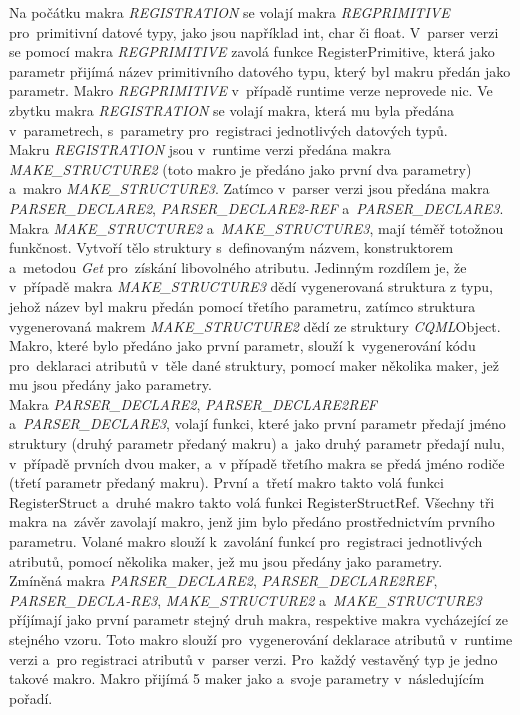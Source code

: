 \documentclass[11pt,twoside,a4paper]{book}
\begin{document}
Na počátku makra \textit{REGISTRATION} se volají makra \textit{REGPRIMITIVE} pro~primitivní datové typy, jako jsou například int, char či float. V~parser verzi se pomocí makra \textit{REGPRIMITIVE} zavolá funkce RegisterPrimitive, která jako parametr přijímá název primitivního datového typu, který byl makru předán jako parametr. Makro \textit{REGPRIMITIVE} v~případě runtime verze neprovede nic. Ve zbytku makra \textit{REGISTRATION} se volají makra, která mu byla předána v~parametrech, s~parametry pro~registraci jednotlivých datových typů.\\
Makru \textit{REGISTRATION} jsou v~runtime verzi předána makra \textit{MAKE\_STRUCTURE2} (toto makro je předáno jako první dva parametry) a~makro \textit{MAKE\_STRUCTURE3}. Zatímco v~parser verzi jsou předána makra \textit{PARSER\_DECLARE2}, \textit{PARSER\_DECLARE2-REF} a~\textit{PARSER\_DECLARE3}.\\
Makra \textit{MAKE\_STRUCTURE2} a~\textit{MAKE\_STRUCTURE3}, mají téměř totožnou funkčnost. Vytvoří tělo struktury s~definovaným názvem, konstruktorem a~metodou \textit{Get} pro~získání libovolného atributu. Jedinným rozdílem je, že v~případě makra \textit{MAKE\_STRUCTURE3} dědí vygenerovaná struktura z typu, jehož název byl makru předán pomocí třetího parametru, zatímco struktura vygenerovaná makrem \textit{MAKE\_STRUCTURE2} dědí ze struktury \textit{CQML}Object. Makro, které bylo předáno jako první parametr, slouží k~vygenerování kódu pro~deklaraci atributů v~těle dané struktury, pomocí maker několika maker, jež mu jsou předány jako parametry.\\
Makra \textit{PARSER\_DECLARE2}, \textit{PARSER\_DECLARE2REF} a~\textit{PARSER\_DECLARE3}, volají funkci, které jako první parametr předají jméno struktury (druhý parametr předaný makru) a~jako druhý parametr předají nulu, v~případě prvních dvou maker, a~v případě třetího makra se předá jméno rodiče (třetí parametr předaný makru). První a~třetí makro takto volá funkci RegisterStruct a~druhé makro takto volá funkci RegisterStructRef. Všechny tři makra na~závěr zavolají makro, jenž jim bylo předáno prostřednictvím prvního parametru. Volané makro slouží k~zavolání funkcí pro~registraci jednotlivých atributů, pomocí několika maker, jež mu jsou předány jako parametry.\\
Zmíněná makra \textit{PARSER\_DECLARE2}, \textit{PARSER\_DECLARE2REF}, \textit{PARSER\_DECLA-RE3}, \textit{MAKE\_STRUCTURE2} a~\textit{MAKE\_STRUCTURE3} příjímají jako první parametr stejný druh makra, respektive makra vycházející ze stejného vzoru. Toto makro slouží pro~vygenerování deklarace atributů v~runtime verzi a~pro registraci atributů v~parser verzi. Pro~každý vestavěný typ je jedno takové makro. Makro přijímá 5 maker jako a~svoje parametry v~následujícím pořadí.
\end{document}
